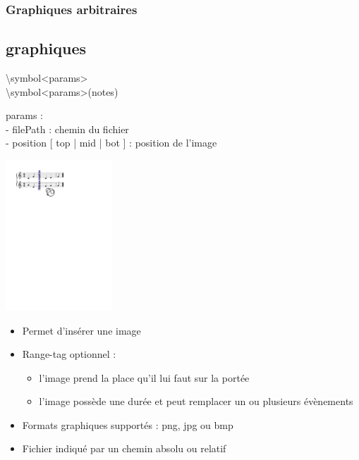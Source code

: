 \documentclass[12pt]{beamer}
\newenvironment{code}
  {\fontfamily{prc}\selectfont}{}
\begin{document}
    \begin{frame}
    \frametitle{Graphiques arbitraires}
    \subsection{graphiques}
   
    \begin{code} 
    \textbackslash{}symbol\textless{}params\textgreater{}\\
    \textbackslash{}symbol\textless{}params\textgreater{}(notes)\\
   \end{code}
    
    \begin{multicols}{2}
    
   \begin{code}
    params :\\
     - filePath : chemin du fichier\\
     - position  [ top | mid | bot ] : position de l’image
    \end{code}
    
    \columnbreak
    
   \hspace{1cm}  \includegraphics[width=4cm]{img/partitions/symbol.pdf}
    
    \end{multicols}
    
    \vspace{-3mm}
    \begin{itemize}
      \item Permet d'insérer une image
      \item Range-tag optionnel : \begin{itemize}
        \item l'image prend la place qu'il lui faut sur la portée
        \item l'image possède une durée et peut remplacer un ou plusieurs évènements
      \end{itemize}
      \item Formats graphiques supportés : png, jpg ou bmp
      \item Fichier indiqué par un chemin absolu ou relatif
    \end{itemize}
    
    \end{frame}
\end{document}
